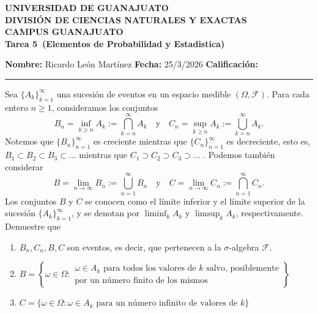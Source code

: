 \documentclass[12pt,a4paper]{article}
\newcommand{\alumno}{Ricardo León Martínez}
\newcommand{\materia}{Elementos de Probabilidad y Estadistica}
\newcommand{\tarea}{Tarea 5}
\newcommand{\fecha}{25/3/2026}
\begin{document}
    \begin{center}
        {\large\textbf{UNIVERSIDAD DE GUANAJUATO}}\\[0.3cm]
        {\normalsize\textbf{DIVISIÓN DE CIENCIAS NATURALES Y EXACTAS}}\\
        {\normalsize\textbf{CAMPUS GUANAJUATO}}\\[1cm]

        {\Large\textbf{\tarea\ (\materia)}}\\[1cm]
    \end{center}

    \noindent
    \textbf{Nombre:} \alumno 
    \hfill 
    \textbf{Fecha:} \fecha 
    \hfill 
    \textbf{Calificación:} \rule{3cm}{0.4pt}

    \vspace{0.3cm}

    \begin{mdframed}[style=mdbluebox,frametitle={Ejercicio 1}]
        Sea $\{A_k\}_{k=1}^\infty$ una sucesión de eventos en un espacio medible $(\Omega,\mathcal{F})$. Para cada entero $n \geq 1$, consideramos los conjuntos
        \[
        B_n = \inf_{k \geq n} A_k := \bigcap_{k=n}^{\infty} A_k
        \quad \text{y} \quad
        C_n = \sup_{k \geq n} A_k := \bigcup_{k=n}^{\infty} A_k .
        \]
        Notemos que $\{B_n\}_{n=1}^\infty$ es creciente mientras que $\{C_n\}_{n=1}^\infty$ es decreciente, esto es, 
        $B_1 \subset B_2 \subset B_3 \subset \dots$ mientras que $C_1 \supset C_2 \supset C_3 \supset \dots$ . Podemos también considerar
        \[
        B = \lim_{n \to \infty} B_n := \bigcup_{n=1}^{\infty} B_n 
        \quad \text{y} \quad
        C = \lim_{n \to \infty} C_n := \bigcap_{n=1}^{\infty} C_n .
        \]
        Los conjuntos $B$ y $C$ se conocen como el límite inferior y el límite superior de la sucesión $\{A_k\}_{k=1}^\infty$, y se denotan por $\liminf_k A_k$ y $\limsup_k A_k$, respectivamente. Demuestre que
        \begin{enumerate}
            \item[(a)] $B_{n},C_{n},B,C$ son eventos, es decir, que pertenecen a la
            $\sigma$-algebra $\mathcal{F}$.
            \item[(b)] $B=\left\{\omega\in\Omega:\begin{matrix}
            \omega\in A_{k}\text{ para todos los valores de $k$ salvo, posiblemente}\\
            \text{por un número finito de los mismos}
            \end{matrix}\right\}$
            \item[(c)] $C=\{\omega\in\Omega:\omega\in A_{k}\text{ para un número infinito de valores de $k$}\}$
        \end{enumerate}
    \end{mdframed}
\end{document}
